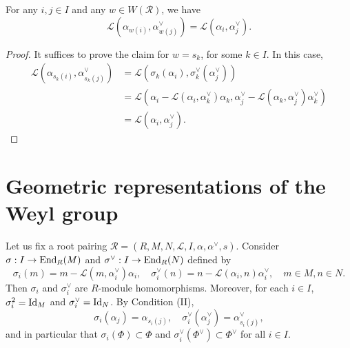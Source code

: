 \begin{lemma}
    For any $i,j \in I$ and any $w \in W(\mathcal{R})$, we have 
    \[
        \mathcal{L}(\alpha_{w(i)},\alpha^\vee_{w(j)}) = \mathcal{L}(\alpha_{i},\alpha_j^\vee).
    \]
\end{lemma}
\begin{proof}
    It suffices to prove the claim for $w = s_k$, for some $k \in I$. In this case, 
    \begin{align*}
        \mathcal{L}(\alpha_{s_k(i)},\alpha^\vee_{s_k(j)}) &=  \mathcal{L}(\sigma_k(\alpha_{i}),\sigma_k^\vee(\alpha^\vee_{j}))\\
                                &= \mathcal{L}(\alpha_{i} - \mathcal{L}(\alpha_i,\alpha_k^\vee)\alpha_k,\alpha^\vee_{j} - \mathcal{L}(\alpha_k,\alpha_j^\vee) \alpha_k^\vee)\\
                            & = \mathcal{L}(\alpha_{i},\alpha^\vee_{j}).
    \end{align*}
\end{proof}

\section{Geometric representations of the Weyl group}
Let us fix a root pairing $\mathcal{R} = (R,M,N,\mathcal{L},I,\alpha, \alpha^\vee,s)$. Consider $\sigma: I \to {\rm End}_R(M)$ and 
$\sigma^\vee : I \to {\rm End}_R(N)$ defined by
\[
    \sigma_i(m) = m - \mathcal{L}(m,\alpha^\vee_i)\alpha_i, \quad \sigma^\vee_i(n) = n - \mathcal{L}(\alpha_i,n)\alpha^\vee_i, \quad m \in M, n \in N.
\]
Then $\sigma_i$ and $\sigma^\vee_i$ are $R$-module homomorphisms. Moreover, 
for each $i \in I$, $\sigma_i^2 = {\rm Id}_M$ and $\sigma_i^\vee = {\rm Id}_N$. By Condition (II), 
\[
    \sigma_i(\alpha_j) = \alpha_{s_i(j)}, \quad \sigma^\vee_i(\alpha^\vee_j) = \alpha^\vee_{s_i(j)},
\]
and in particular that $\sigma_i(\Phi) \subset \Phi$ and 
$\sigma_i^\vee(\Phi^\vee) \subset \Phi^\vee$ for all $i \in I$.

